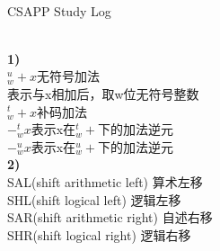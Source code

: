 \documentclass{article}
\begin{document}
\begin{CJK}{UTF8}{gkai}
\end{CJK}
\begin{CJK}{UTF8}{gbsn}
\textcolor[rgb]{1,0,0}{\begin{math} \end{math} \begin{math}			\end{math}}
\fontsize{40pt}{40pt}\selectfont
\centerline{CSAPP Study Log}		\\[3ex]
\fontsize{18pt}{18pt}\selectfont
\textbf{1)}				\\[0.5ex]
$_w^u+x$无符号加法			\\[0.5ex]
表示与x相加后，取w位无符号整数		\\[0.5ex]
$_w^t+x$补码加法			\\[0.5ex]
$-_w^tx$表示x在$^t_w+$下的加法逆元	\\[0.5ex]
$-_w^ux$表示x在$_w^u+$下的加法逆元	\\[0.5ex]
\textbf{2)}	\\
SAL(shift arithmetic left)	算术左移	\\
SHL(shift logical left)		逻辑左移	\\
SAR(shift arithmetic right)	自述右移	\\
SHR(shift logical right)	逻辑右移	\\




\end{CJK}
\end{document}
